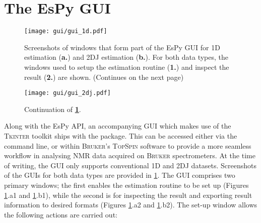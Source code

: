 \section{The \acs{EsPy} \acs{GUI}}
\begin{figure}
    \centering
    \texttt{[image: gui/gui\_1d.pdf]}
    \caption[
        Screenshots of the \acs{EsPy} \acs{GUI} for \ac{1D} and \acs{2DJ} estimation.
    ]{
        Screenshots of windows that form part of the \ac{EsPy} \ac{GUI} for
        \ac{1D} estimation (\textbf{a.}) and \ac{2DJ} estimation (\textbf{b.}).
        For both data types, the windows used to setup the estimation routine
        (\textbf{1.}) and inspect the result (\textbf{2.}) are shown.
        (Continues on the next page)
    }
    \label{fig:gui}
\end{figure}
\begin{figure}%
    \ContinuedFloat
    \centering
    \texttt{[image: gui/gui\_2dj.pdf]}
    \caption*{Continuation of \textbf{\textsc{\cref{fig:gui}}}.}
\end{figure}
Along with the \ac{EsPy} \ac{API}, an accompanying \ac{GUI} which makes use of
the \textsc{Tkinter} toolkit\cite{tkinter} ships with the
package. This can be accessed either via the command line, or within
\textsc{Bruker}'s \textsc{TopSpin} software to provide a more seamless workflow
in analysing \ac{NMR} data acquired on \textsc{Bruker} spectrometers.
At the time of writing, the \ac{GUI} only supports conventional \ac{1D}
and \ac{2DJ} datasets. Screenshots of the \acp{GUI} for both data types are
provided in \cref{fig:gui}.
The \ac{GUI} comprises two primary windows; the first enables the estimation
routine to be set up (Figures \ref{fig:gui}.a1 and \ref{fig:gui}.b1), while the
second is for inspecting the result and exporting result information to desired
formats (Figures \ref{fig:gui}.a2 and \ref{fig:gui}.b2). The set-up window
allows the following actions are carried out:
